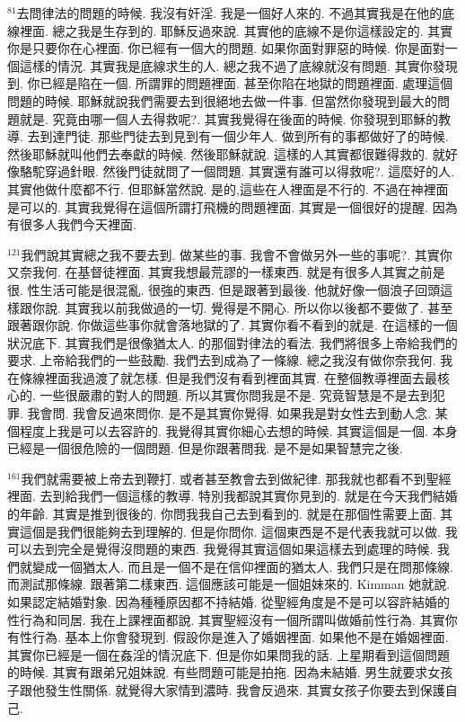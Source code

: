 \documentclass{book}
\begin{document}
$^{81}$去問律法的問題的時候.
我沒有奸淫.
我是一個好人來的.
不過其實我是在他的底線裡面.
總之我是生存到的.
耶穌反過來說.
其實他的底線不是你這樣設定的.
其實你是只要你在心裡面.
你已經有一個大的問題.
如果你面對罪惡的時候.
你是面對一個這樣的情況.
其實我是底線求生的人.
總之我不過了底線就沒有問題.
其實你發現到.
你已經是陷在一個.
所謂罪的問題裡面.
甚至你陷在地獄的問題裡面.
處理這個問題的時候.
耶穌就說我們需要去到很絕地去做一件事.
但當然你發現到最大的問題就是.
究竟由哪一個人去得救呢?.
其實我覺得在後面的時候.
你發現到耶穌的教導.
去到達門徒.
那些門徒去到見到有一個少年人.
做到所有的事都做好了的時候.
然後耶穌就叫他們去奉獻的時候.
然後耶穌就說.
這樣的人其實都很難得救的.
就好像駱駝穿過針眼.
然後門徒就問了一個問題.
其實還有誰可以得救呢?.
這麼好的人.
其實他做什麼都不行.
但耶穌當然說.
是的,這些在人裡面是不行的.
不過在神裡面是可以的.
其實我覺得在這個所謂打飛機的問題裡面.
其實是一個很好的提醒.
因為有很多人我們今天裡面.

$^{121}$我們說其實總之我不要去到.
做某些的事.
我會不會做另外一些的事呢?.
其實你又奈我何.
在基督徒裡面.
其實我想最荒謬的一樣東西.
就是有很多人其實之前是很.
性生活可能是很混亂.
很強的東西.
但是跟著到最後.
他就好像一個浪子回頭這樣跟你說.
其實我以前我做過的一切.
覺得是不開心.
所以你以後都不要做了.
甚至跟著跟你說.
你做這些事你就會落地獄的了.
其實你看不看到的就是.
在這樣的一個狀況底下.
其實我們是很像猶太人.
的那個對律法的看法.
我們將很多上帝給我們的要求.
上帝給我們的一些鼓勵.
我們去到成為了一條線.
總之我沒有做你奈我何.
我在條線裡面我過渡了就怎樣.
但是我們沒有看到裡面其實.
在整個教導裡面去最核心的.
一些很嚴肅的對人的問題.
所以其實你問我是不是.
究竟智慧是不是去到犯罪.
我會問.
我會反過來問你.
是不是其實你覺得.
如果我是對女性去到動人念.
某個程度上我是可以去容許的.
我覺得其實你細心去想的時候.
其實這個是一個.
本身已經是一個很危險的一個問題.
但是你跟著問我.
是不是如果智慧完之後.

$^{161}$我們就需要被上帝去到鞭打.
或者甚至教會去到做紀律.
那我就也都看不到聖經裡面.
去到給我們一個這樣的教導.
特別我都說其實你見到的.
就是在今天我們結婚的年齡.
其實是推到很後的.
你問我我自己去到看到的.
就是在那個性需要上面.
其實這個是我們很能夠去到理解的.
但是你問你.
這個東西是不是代表我就可以做.
我可以去到完全是覺得沒問題的東西.
我覺得其實這個如果這樣去到處理的時候.
我們就變成一個猶太人.
而且是一個不是在信仰裡面的猶太人.
我們只是在問那條線.
而測試那條線.
跟著第二樣東西.
這個應該可能是一個姐妹來的.
Kimman 她就說.
如果認定結婚對象.
因為種種原因都不持結婚.
從聖經角度是不是可以容許結婚的性行為和同居.
我在上課裡面都說.
其實聖經沒有一個所謂叫做婚前性行為.
其實你有性行為.
基本上你會發現到.
假設你是進入了婚姻裡面.
如果他不是在婚姻裡面.
其實你已經是一個在姦淫的情況底下.
但是你如果問我的話.
上星期看到這個問題的時候.
其實有跟弟兄姐妹說.
有些問題可能是拍拖.
因為未結婚.
男生就要求女孩子跟他發生性關係.
就覺得大家情到濃時.
我會反過來.
其實女孩子你要去到保護自己.
\end{document}
